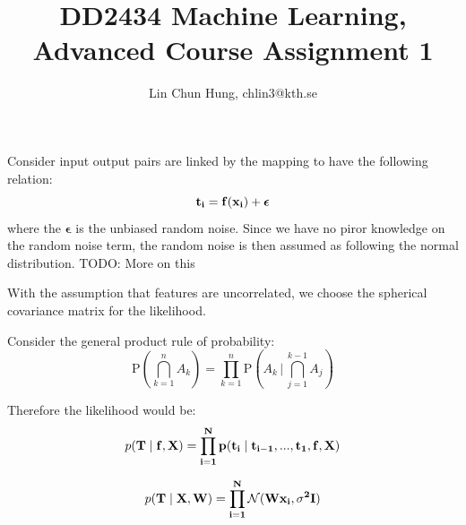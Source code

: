 \documentclass[12pt]{article}
\newenvironment{question}[2][Question]{\begin{trivlist}
\kern10pt
\item[\hskip \labelsep {\bfseries #1}\hskip \labelsep {\bfseries #2.}]}{\end{trivlist}}
\begin{document}
 
 
 
\title{DD2434 Machine Learning, Advanced Course Assignment 1}
\author{Lin Chun Hung, chlin3@kth.se} 
 
\maketitle


\begin{question}{1}
Consider input output pairs are linked by the mapping to have the following
 relation:
$$ 
    \bf{t}_i = f(\bf{x}_i) + \bm{\epsilon}
$$
where the $\bm{\epsilon}$ is the unbiased random noise. Since we have no piror knowledge
on the random noise term, the random noise is then assumed as following the normal
distribution. TODO: More on this \par

With the assumption that features are uncorrelated, we choose the spherical
covariance matrix for the likelihood.
\end{question}



\begin{question}{2}
Consider the general product rule of probability:
$$\mathrm {P} \left(\bigcap _{k=1}^{n}A_{k}\right)=
  \prod _{k=1}^{n}\mathrm {P} \left(A_{k}\,{\Bigg |}\,\bigcap _{j=1}^{k-1}A_{j}\right)$$

Therefore the likelihood would be:
$$ 
  p(\bf{T}\mid f,\bf{X}) =
  \prod _{i=1}^{N}p(\bf{t}_i \mid \bf{t}_{i-1},...,\bf{t}_{1},
  f,\bf{X})
$$

\end{question} 


\begin{question}{3}

$$ 
  p(\bf{T}\mid \bf{X},\bf{W}) =
  \prod _{i=1}^{N}\mathcal{N}(\bf{W}\bf{x}_i, \sigma^2\bf{I})
$$

\end{question}
\end{document}
